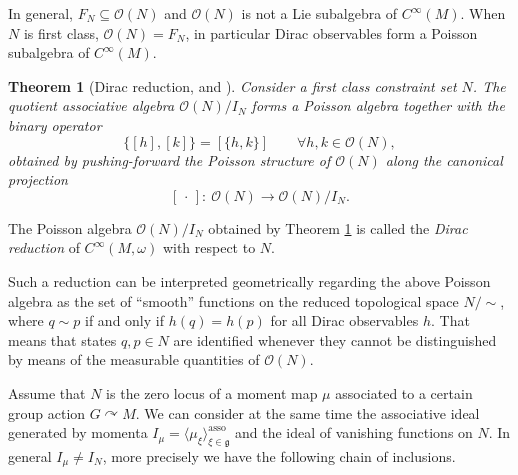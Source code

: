 \documentclass[10pt,a4paper]{amsart}
\numberwithin{equation}{section}
\newtheorem{Theorem}{Theorem}[section]
\DeclareMathOperator{\action}{\curvearrowright}
\renewcommand{\subset}{\subseteq}
\begin{document}
\begin{Remark}
	In general, $F_N \subset \mathcal{O}(N)$ and $\mathcal{O}(N)$ is not a Lie subalgebra of $C^\infty(M)$.
	When $N$ is first class, $\mathcal{O}(N)= F_N$, in particular Dirac observables form a Poisson subalgebra of $C^\infty(M)$.
\end{Remark}

\begin{Theorem}[Dirac reduction, {\cite{Dirac64} and \cite[Proposition~3.1]{ArmsGotayJennings90}}]\label{thm:Dirac}
	Consider a first class constraint set $N$.
	The quotient associative algebra $\mathcal{O}(N)/I_N$ forms a Poisson algebra together with the binary operator
	\begin{displaymath}
		\lbrace [h], [k] \rbrace = [\lbrace h, k \rbrace] \qquad \forall h,k \in \mathcal{O}(N),
	\end{displaymath}
	obtained by pushing-forward the Poisson structure of $\mathcal{O}(N)$ along the canonical projection
\[
[\,\cdot\,]\colon \ \mathcal{O}(N) \to \mathcal{O}(N)/I_N.
\]
\end{Theorem}

\begin{Definition}
	The Poisson algebra $\mathcal{O}(N)/I_N$ obtained by Theorem \ref{thm:Dirac} is called the \emph{Dirac reduction} of $C^\infty(M,\omega)$ with respect to $N$.
\end{Definition}	

Such a reduction can be interpreted geometrically regarding the above Poisson algebra as the set of ``smooth'' functions on the reduced topological space $N/{\sim}$, where $q\sim p$ if and only if $h(q)=h(p)$ for all Dirac observables $h$.
That means that states $q,p\in N$ are identified whenever they cannot be distinguished by means of the measurable quantities of $\mathcal{O}(N)$.

Assume that $N$ is the zero locus of a moment map $\mu$ associated to a certain group action $G\action M$.
We can consider at the same time the associative ideal generated by momenta $I_{\mu}=\langle \mu_\xi \rangle_{\xi \in \mathfrak{g}}^{\text{asso}}$ and the ideal of vanishing functions on $N$.
In general $I_{\mu}\neq I_{N}$, more precisely we have the following chain of inclusions.
\end{document}
